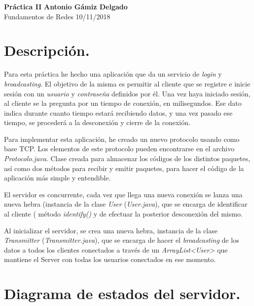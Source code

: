 \documentclass[a4paper, 11pt]{article}
\begin{document}
\noindent
\large\textbf{Práctica II} \hfill \textbf{Antonio Gámiz Delgado} \\
\normalsize Fundamentos de Redes \hfill 10/11/2018

\section{Descripción.}

Para esta práctica he hecho una aplicación que da un servicio de \textit{login} y \textit{broadcasting}. El objetivo de la misma es permitir al cliente que se registre e inicie sesión con un \textit{usuario} y \textit{contraseña} definidos por él. Una vez haya iniciado sesión, al cliente se la pregunta por un tiempo de conexión, en milisegundos. Ese dato indica durante cuanto tiempo estará recibiendo datos, y una vez pasado ese tiempo, se procederá a la desconexión y cierre de la conexión.

Para implementar esta aplicación, he creado un nuevo protocolo usando como base TCP. Los elementos de este protocolo pueden encontrarse en el archivo \textit{Protocolo.java}. Clase creada para almacenar los códigos de los distintos paquetes, así como dos métodos para recibir y emitir paquetes, para hacer el código de la aplicación más simple y entendible. 

El servidor es concurrente, cada vez que llega una nueva conexión se lanza una nueva hebra (instancia de la clase \textit{User} (\textit{User.java}), que se encarga de identificar al cliente ( método \textit{identify()} y de efectuar la posterior desconexión del mismo. 

Al inicializar el servidor, se crea una nueva hebra, instancia de la clase \textit{Transmitter} (\textit{Transmitter.java}), que se encarga de hacer el \textit{broadcasting} de los datos a todos los clientes conectados a través de un \textit{ArrayList\textless User\textgreater} que mantiene el Server con todas los usuarios conectados en ese momento.
 
\section{Diagrama de estados del servidor.}
\end{document}
